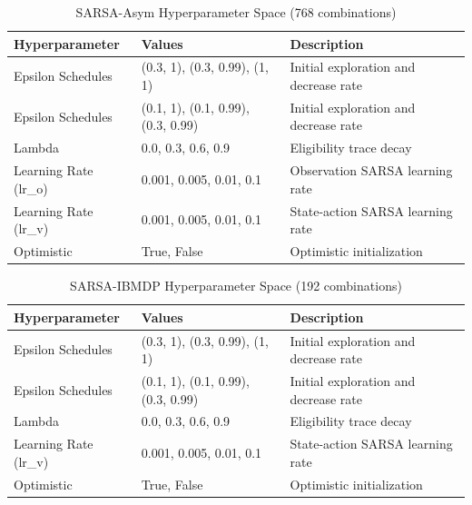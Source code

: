 \begin{table}
\small
\centering
\caption{SARSA-Asym Hyperparameter Space (768 combinations)}
\begin{tabular}{lll}
\toprule
\textbf{Hyperparameter} & \textbf{Values} & \textbf{Description} \\
\midrule
Epsilon Schedules & (0.3, 1), (0.3, 0.99), (1, 1) & Initial exploration and decrease rate \\
Epsilon Schedules & (0.1, 1), (0.1, 0.99), (0.3, 0.99) & Initial exploration and decrease rate \\
Lambda & 0.0, 0.3, 0.6, 0.9 & Eligibility trace decay \\
Learning Rate (lr\_o) & 0.001, 0.005, 0.01, 0.1 & Observation SARSA learning rate \\
Learning Rate (lr\_v) & 0.001, 0.005, 0.01, 0.1 & State-action SARSA learning rate \\
Optimistic & True, False & Optimistic initialization \\
\bottomrule
\end{tabular}
\end{table}

\begin{table}
\small
\centering
\caption{SARSA-IBMDP Hyperparameter Space (192 combinations)}
\begin{tabular}{lll}
\toprule
\textbf{Hyperparameter} & \textbf{Values} & \textbf{Description} \\
\midrule
Epsilon Schedules & (0.3, 1), (0.3, 0.99), (1, 1) & Initial exploration and decrease rate \\
Epsilon Schedules & (0.1, 1), (0.1, 0.99), (0.3, 0.99) & Initial exploration and decrease rate \\
Lambda & 0.0, 0.3, 0.6, 0.9 & Eligibility trace decay \\
Learning Rate (lr\_v) & 0.001, 0.005, 0.01, 0.1 & State-action SARSA learning rate \\
Optimistic & True, False & Optimistic initialization \\
\bottomrule
\end{tabular}
\end{table}


